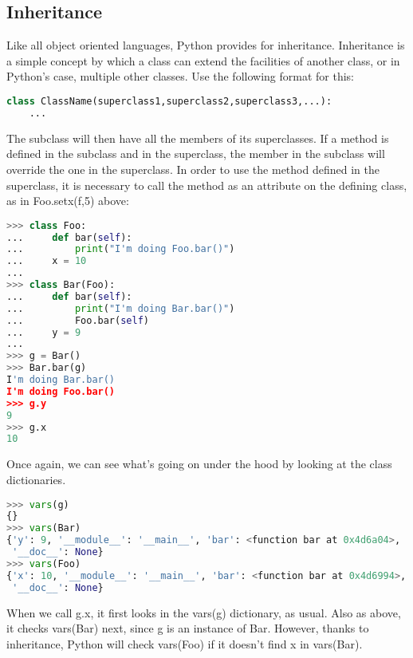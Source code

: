 \subsection{Inheritance}
Like all object oriented languages, Python provides for inheritance. Inheritance
is a simple concept by which a class can extend the facilities of another class,
or in Python's case, multiple other classes. Use the following format for this:
\lstset{basicstyle=\scriptsize, numbers=left, captionpos=b, tabsize=4}
\begin{lstlisting}[caption=Inheritance,language={Python},
xleftmargin=15pt, label=lst:inheritance]
class ClassName(superclass1,superclass2,superclass3,...):
    ...
\end{lstlisting}

The subclass will then have all the members of its superclasses. If a method is
defined in the subclass and in the superclass, the member in the subclass will
override the one in the superclass. In order to use the method defined in the
superclass, it is necessary to call the method as an attribute on the defining
class, as in Foo.setx(f,5) above:
\lstset{basicstyle=\scriptsize, numbers=left, captionpos=b, tabsize=4}
\begin{lstlisting}[caption=Inheritance Example,language={Python},
xleftmargin=15pt, label=lst:inheritanceexample]
>>> class Foo:
...     def bar(self):
...         print("I'm doing Foo.bar()")
...     x = 10
...
>>> class Bar(Foo):
...     def bar(self):
...         print("I'm doing Bar.bar()")
...         Foo.bar(self)
...     y = 9
...
>>> g = Bar()
>>> Bar.bar(g)
I'm doing Bar.bar()
I'm doing Foo.bar()
>>> g.y
9
>>> g.x
10
\end{lstlisting}

Once again, we can see what's going on under the hood by looking at the class
dictionaries.
\lstset{basicstyle=\scriptsize, numbers=left, captionpos=b, tabsize=4}
\begin{lstlisting}[caption=Inherited Member,language={Python},
xleftmargin=15pt, label=lst:]
>>> vars(g)
{}
>>> vars(Bar)
{'y': 9, '__module__': '__main__', 'bar': <function bar at 0x4d6a04>,
 '__doc__': None}
>>> vars(Foo)
{'x': 10, '__module__': '__main__', 'bar': <function bar at 0x4d6994>,
 '__doc__': None}
\end{lstlisting}

When we call g.x, it first looks in the vars(g) dictionary, as usual. Also as
above, it checks vars(Bar) next, since g is an instance of Bar. However, thanks
to inheritance, Python will check vars(Foo) if it doesn't find x in vars(Bar).

